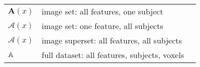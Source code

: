 \begin{singlespacing}
\begin{table}[H]
\begin{tabular}{lll}
    $\bm{A}(x)$           & image set: all features, one subject                 &                      \\
    $\mathcal{A}(x)$      & image set: one feature, all subjects                 &                      \\
    $\bm{\mathcal{A}}(x)$ & image superset: all features, all subjects           &                      \\
    $\mathbb{A}$               & full dataset: all features, subjects, voxels         &                      \\ \hline
  \end{tabular}
\end{table}
\end{singlespacing}
\clearpage
{}
\setcounter{page}{1}

